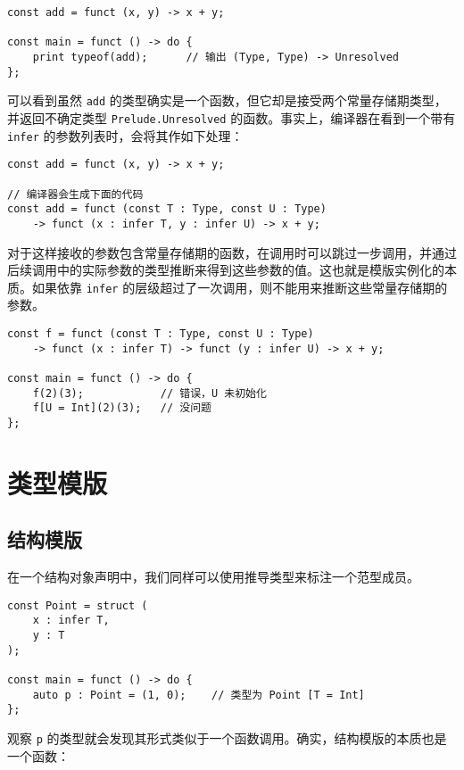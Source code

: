 \begin{lstlisting}
const add = funct (x, y) -> x + y;

const main = funct () -> do {
	print typeof(add);		// 输出 (Type, Type) -> Unresolved
};
\end{lstlisting}

可以看到虽然 \lstinline!add! 的类型确实是一个函数，但它却是接受两个常量存储期类型，并返回不确定类型 \lstinline!Prelude.Unresolved! 的函数。事实上，编译器在看到一个带有 \lstinline!infer! 的参数列表时，会将其作如下处理：

\begin{lstlisting}
const add = funct (x, y) -> x + y;

// 编译器会生成下面的代码
const add = funct (const T : Type, const U : Type) 
	-> funct (x : infer T, y : infer U) -> x + y;
\end{lstlisting}

对于这样接收的参数包含常量存储期的函数，在调用时可以跳过一步调用，并通过后续调用中的实际参数的类型推断来得到这些参数的值。这也就是模版实例化的本质。如果依靠 \lstinline!infer! 的层级超过了一次调用，则不能用来推断这些常量存储期的参数。

\begin{lstlisting}
const f = funct (const T : Type, const U : Type) 
	-> funct (x : infer T) -> funct (y : infer U) -> x + y;
	
const main = funct () -> do {
	f(2)(3);			// 错误，U 未初始化
	f[U = Int](2)(3);	// 没问题
};
\end{lstlisting}

\section{类型模版}

\subsection{结构模版}

在一个结构对象声明中，我们同样可以使用推导类型来标注一个范型成员。

\begin{lstlisting}
const Point = struct (
	x : infer T,
	y : T
);

const main = funct () -> do {
	auto p : Point = (1, 0);	// 类型为 Point [T = Int]
};
\end{lstlisting}

观察 \lstinline!p! 的类型就会发现其形式类似于一个函数调用。确实，结构模版的本质也是一个函数：

